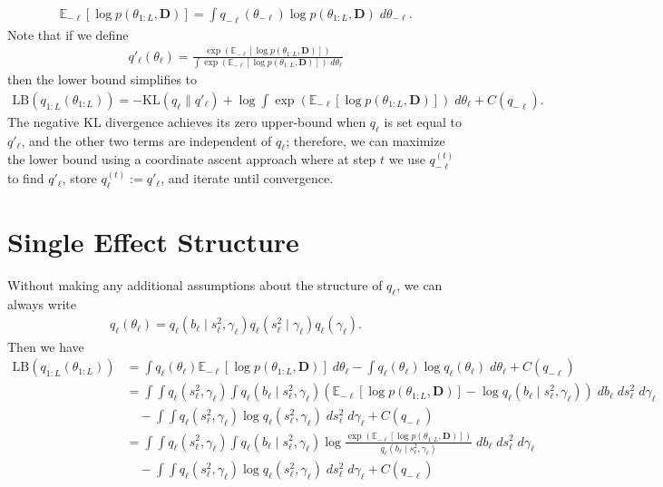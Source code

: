 \documentclass{article}
\newcommand{\E}{\mathbb{E}}
\begin{document}
\begin{align*}
    \E_{-\ell}\left[\log p(\theta_{1:L}, \mathbf{D})\right] =  \int q_{-\ell}(\theta_{-\ell}) \log p(\theta_{1:L}, \mathbf{D}) \;d\theta_{-\ell}.
\end{align*}
Note that if we define 
\begin{align*}
    q'_\ell(\theta_\ell) = \frac{\exp\left(\E_{-\ell}\left[\log p(\theta_{1:L}, \mathbf{D})\right]\right)}{\int \exp\left(\E_{-\ell}\left[\log p(\theta_{1:L}, \mathbf{D})\right]\right) \; d\theta_\ell}
\end{align*}
then the lower bound simplifies to 
\begin{align*}
     \text{LB}(q_{1:L}(\theta_{1:L})) = -\text{KL}(q_\ell \lVert q'_\ell) + \log \int \exp\left(\E_{-\ell}\left[\log p(\theta_{1:L}, \mathbf{D})\right]\right) \; d\theta_\ell + C(q_{-\ell}).
\end{align*}
The negative KL divergence achieves its zero upper-bound when $q_\ell$ is set equal to $q'_\ell$, and the other two terms are independent of $q_\ell$; therefore, we can maximize the lower bound using a coordinate ascent approach where at step $t$ we use $q^{(t)}_{-\ell}$ to find $q'_\ell$, store $q^{(t)}_\ell := q'_\ell$, and iterate until convergence.

\section{Single Effect Structure}

Without making any additional assumptions about the structure of $q_\ell$, we can always write
\begin{align*}
    q_\ell(\theta_\ell) = q_\ell(b_\ell\;|\;s^2_\ell,\gamma_\ell)q_\ell(s^2_\ell\;|\;\gamma_\ell)q_\ell(\gamma_\ell).
\end{align*}
Then we have 
\begin{align*}
    \text{LB}(q_{1:L}(\theta_{1:L})) &= \int q_\ell(\theta_\ell) \E_{-\ell}\left[\log p(\theta_{1:L}, \mathbf{D})\right]\;d\theta_{\ell} - \int q_\ell(\theta_\ell) \log q_\ell(\theta_\ell)\;d\theta_{\ell} + C(q_{-\ell}) \\
    &= \int\int q_\ell(s^2_\ell, \gamma_\ell) \int q_\ell(b_\ell\;|\;s^2_\ell,\gamma_\ell)\left(\E_{-\ell}\left[\log p(\theta_{1:L}, \mathbf{D})\right] - \log q_\ell(b_\ell\;|\;s^2_\ell,\gamma_\ell) \right)\; db_\ell \; ds_\ell^2\;d\gamma_\ell \\
    &\quad - \int\int q_\ell(s^2_\ell, \gamma_\ell) \log q_\ell(s^2_\ell, \gamma_\ell) \; ds_\ell^2\;d\gamma_\ell + C(q_{-\ell}) \\
    &= \int\int q_\ell(s^2_\ell, \gamma_\ell) \int q_\ell(b_\ell\;|\;s^2_\ell,\gamma_\ell) \log \frac{\exp\left(\E_{-\ell}\left[\log p(\theta_{1:L}, \mathbf{D})\right]\right)}{q_\ell(b_\ell\;|\;s^2_\ell,\gamma_\ell)}\; db_\ell \; ds_\ell^2\;d\gamma_\ell \\
    &\quad - \int\int q_\ell(s^2_\ell, \gamma_\ell) \log q_\ell(s^2_\ell, \gamma_\ell) \; ds_\ell^2\;d\gamma_\ell + C(q_{-\ell})
\end{align*}
\end{document}
